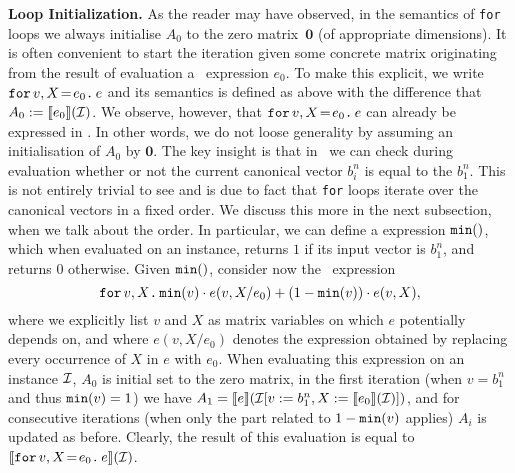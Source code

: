 \noindent\textbf{Loop Initialization.} As the reader may have observed, in the semantics of \texttt{for} loops we 
always initialise $A_0$ to the zero matrix~$\mathbf{0}$ (of appropriate dimensions). It is often convenient
to start the iteration given some concrete matrix  originating from the result of evaluation a \langfor\ expression $e_0$. To make this explicit, we write $\initf{e_0}{v}{X}{e}$ and its semantics is defined as above
with the difference that $A_0:=\sem{e_0}{\I}$. We observe, however, that $\initf{e_0}{v}{X}{e}$ can already
be expressed in \langfor. In other words, we do not loose generality by assuming an initialisation of $A_0$ by $\mathbf{0}$.
The key insight is that in \langfor\ we can check during evaluation whether or not
the current canonical vector $b_i^n$ is equal to the $b_1^n$. This is not entirely trivial to see and is due to fact that \texttt{for} loops iterate over the canonical vectors in a fixed order. We discuss this more in the next subsection, when we talk about the order. In particular, we can define a \langfor expression $\mmin$, which when evaluated on an instance, returns $1$ if its input vector is $b_1^n$, and returns $0$ otherwise. Given $\mmin$, consider now the
\langfor\ expression
 $$\ffor{v}{X}{\mmin{v}\cdot e(v,X/e_0) + (1-\mmin{v})\cdot e(v,X)},$$
 where we explicitly list $v$ and $X$ as matrix variables on which $e$ potentially depends on, and where
 $e(v,X/e_0)$ denotes the expression obtained by replacing every occurrence of $X$ in $e$ with $e_0$.
%
When evaluating this expression on an instance $\I$, $A_0$ is initial set to the zero matrix, in the first iteration (when  $v=b_1^n$ and thus $\mmin{v}=1$)
we have $A_1=\sem{e}{\I[v:=b_1^n,X:=\sem{e_0}{\I}]}$, and for consecutive iterations (when only the part related to $1-\mmin{v}$ applies) $A_i$ is updated as before. Clearly, the result of this evaluation is equal to
$\sem{\initf{e_0}{v}{X}{e}}{\I}$. 

